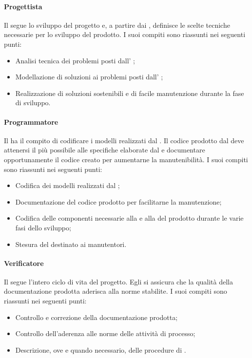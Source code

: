 \paragraph{Progettista}
Il \prog{} segue lo sviluppo del progetto e, a partire dai , definisce le scelte tecniche necessarie per lo sviluppo del prodotto. 
I suoi compiti sono riassunti nei seguenti punti:
\begin{itemize}
\item Analisi tecnica dei problemi posti dall' \ana{};
\item Modellazione di soluzioni ai problemi posti dall' \ana{};
\item Realizzazione di soluzioni sostenibili e di facile manutenzione durante la fase di sviluppo.
\end{itemize}

\paragraph{Programmatore}
Il \progr{} ha il compito di codificare i modelli realizzati dal \prog{}. Il codice prodotto dal \progr{} deve attenersi il più possibile alle specifiche elaborate dal \prog{} e documentare opportunamente il codice creato per aumentarne la manutenibilità.
I suoi compiti sono riassunti nei seguenti punti:
\begin{itemize}
\item Codifica dei modelli realizzati dal \prog{};
\item Documentazione del codice prodotto per facilitarne la manutenzione;
\item Codifica delle componenti necessarie alla  e alla  del prodotto durante le varie fasi dello sviluppo;
\item Stesura del \MU{} destinato ai manutentori.
\end{itemize}

\paragraph{Verificatore}
Il \ver{} segue l'intero ciclo di vita del progetto. Egli si assicura che la qualità della documentazione prodotta aderisca alla norme stabilite. I suoi compiti sono riassunti nei seguenti punti:
\begin{itemize}
\item Controllo e correzione della documentazione prodotta;
\item Controllo dell'aderenza alle norme delle attività di processo;
\item Descrizione, ove e quando necessario, delle procedure di .
\end{itemize}

